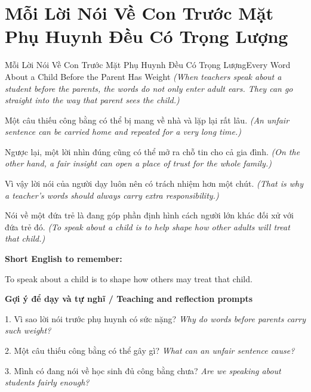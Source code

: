\section{Mỗi Lời Nói Về Con Trước Mặt Phụ Huynh Đều Có Trọng Lượng}
\begin{truyen}{Mỗi Lời Nói Về Con Trước Mặt Phụ Huynh Đều Có Trọng Lượng}{Every Word About a Child Before the Parent Has Weight}
\textit{(When teachers speak about a student before the parents, the words do not only enter adult ears. They can go straight into the way that parent sees the child.)}

Một câu thiếu công bằng có thể bị mang về nhà và lặp lại rất lâu.
\textit{(An unfair sentence can be carried home and repeated for a very long time.)}

Ngược lại, một lời nhìn đúng cũng có thể mở ra chỗ tin cho cả gia đình.
\textit{(On the other hand, a fair insight can open a place of trust for the whole family.)}

Vì vậy lời nói của người dạy luôn nên có trách nhiệm hơn một chút.
\textit{(That is why a teacher’s words should always carry extra responsibility.)}

\end{truyen}

\begin{baihoc}
Nói về một đứa trẻ là đang góp phần định hình cách người lớn khác đối xử với đứa trẻ đó.
\textit{(To speak about a child is to help shape how other adults will treat that child.)}
\end{baihoc}

\begin{ghinhoanh}
\textbf{Short English to remember:}

To speak about a child is to shape how others may treat that child.

\end{ghinhoanh}

\begin{tuhocnhanh}
\textbf{Gợi ý để dạy và tự nghĩ / Teaching and reflection prompts}

1. Vì sao lời nói trước phụ huynh có sức nặng? \textit{Why do words before parents carry such weight?}

2. Một câu thiếu công bằng có thể gây gì? \textit{What can an unfair sentence cause?}

3. Mình có đang nói về học sinh đủ công bằng chưa? \textit{Are we speaking about students fairly enough?}
\end{tuhocnhanh}

